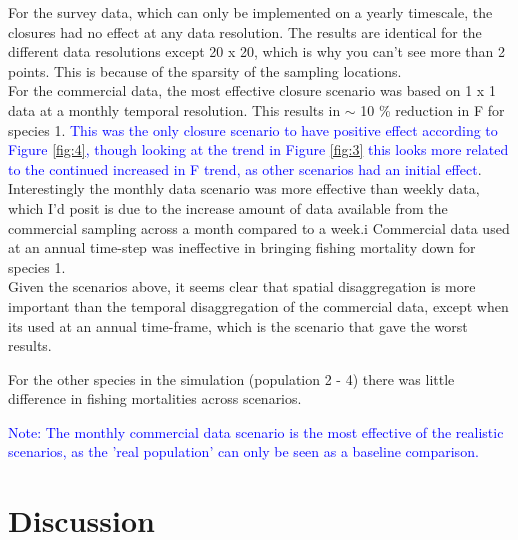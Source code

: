 \documentclass[review]{elsarticle}
\begin{document}
For the survey data, which can only be implemented on a yearly timescale, the
closures had no effect at any data resolution. The results are identical for
the different data resolutions except 20 x 20, which is why you can't see more
than 2 points. This is because of the sparsity of the sampling locations.\\

For the commercial data, the most effective closure scenario was based on 1 x 1
data at a monthly temporal resolution. This results in $\sim$ 10 \% reduction
in F for species 1. \textcolor{blue}{This was the only closure scenario to have
	positive effect according to Figure \ref{fig:4}, though looking at the
	trend in Figure \ref{fig:3} this looks more related to the continued
	increased in F trend, as other scenarios had an initial effect}.
Interestingly the monthly data scenario was more effective than weekly data,
which I'd posit is due to the increase amount of data available from the
commercial sampling across a month compared to a week.i Commercial data used at
an annual time-step was ineffective in bringing fishing mortality down for
species 1. \\

Given the scenarios above, it seems clear that spatial disaggregation is more
important than the temporal disaggregation of the commercial data, except when
its used at an annual time-frame, which is the scenario that gave the worst
results.

For the other species in the simulation (population 2 - 4) there was little
difference in fishing mortalities across scenarios.

\textcolor{blue}{Note: The monthly commercial data scenario is the most
	effective of the realistic scenarios, as the 'real population' can only
	be seen as a baseline comparison.}

\section{Discussion}
\end{document}

